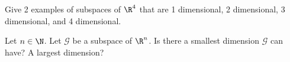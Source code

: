 \begin{exercises}
\begin{problist}
		\prob Give 2 examples of subspaces of $\R^4$ that are 1 dimensional, 2 dimensional,
		3 dimensional, and 4 dimensional.

		\prob Let $n \in \N$. Let $\mathcal G$ be a subspace of $\R^n$. Is there a
		smallest dimension $\mathcal G$ can have? A largest dimension?
	\end{problist}
\end{exercises}
